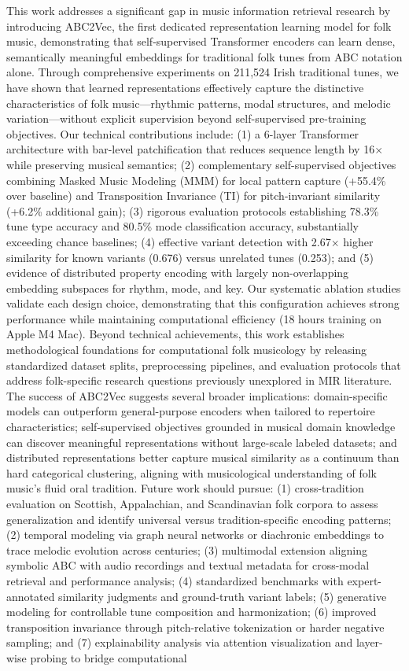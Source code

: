 \documentclass[]{interact}
\theoremstyle{plain}
\theoremstyle{definition}
\theoremstyle{remark}
\begin{document}
This work addresses a significant gap in music information retrieval research by introducing ABC2Vec, the first dedicated representation learning model for folk music, demonstrating that self-supervised Transformer encoders can learn dense, semantically meaningful embeddings for traditional folk tunes from ABC notation alone. Through comprehensive experiments on 211,524 Irish traditional tunes, we have shown that learned representations effectively capture the distinctive characteristics of folk music---rhythmic patterns, modal structures, and melodic variation---without explicit supervision beyond self-supervised pre-training objectives. Our technical contributions include: (1) a 6-layer Transformer architecture with bar-level patchification that reduces sequence length by 16$\times$ while preserving musical semantics; (2) complementary self-supervised objectives combining Masked Music Modeling (MMM) for local pattern capture (+55.4\% over baseline) and Transposition Invariance (TI) for pitch-invariant similarity (+6.2\% additional gain); (3) rigorous evaluation protocols establishing 78.3\% tune type accuracy and 80.5\% mode classification accuracy, substantially exceeding chance baselines; (4) effective variant detection with 2.67$\times$ higher similarity for known variants (0.676) versus unrelated tunes (0.253); and (5) evidence of distributed property encoding with largely non-overlapping embedding subspaces for rhythm, mode, and key. Our systematic ablation studies validate each design choice, demonstrating that this configuration achieves strong performance while maintaining computational efficiency (18 hours training on Apple M4 Mac). Beyond technical achievements, this work establishes methodological foundations for computational folk musicology by releasing standardized dataset splits, preprocessing pipelines, and evaluation protocols that address folk-specific research questions previously unexplored in MIR literature. The success of ABC2Vec suggests several broader implications: domain-specific models can outperform general-purpose encoders when tailored to repertoire characteristics; self-supervised objectives grounded in musical domain knowledge can discover meaningful representations without large-scale labeled datasets; and distributed representations better capture musical similarity as a continuum than hard categorical clustering, aligning with musicological understanding of folk music's fluid oral tradition. Future work should pursue: (1) cross-tradition evaluation on Scottish, Appalachian, and Scandinavian folk corpora to assess generalization and identify universal versus tradition-specific encoding patterns; (2) temporal modeling via graph neural networks or diachronic embeddings to trace melodic evolution across centuries; (3) multimodal extension aligning symbolic ABC with audio recordings and textual metadata for cross-modal retrieval and performance analysis; (4) standardized benchmarks with expert-annotated similarity judgments and ground-truth variant labels; (5) generative modeling for controllable tune composition and harmonization; (6) improved transposition invariance through pitch-relative tokenization or harder negative sampling; and (7) explainability analysis via attention visualization and layer-wise probing to bridge computational 
\end{document}
